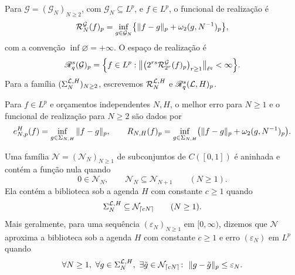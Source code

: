 \documentclass[12pt,a4paper]{article}
\begin{document}
\begin{definicao}
\label{lp:def:realization}
Para $\mathcal G=(\mathcal G_N)_{N\ge2}$, com $\mathcal G_N\subseteq L^p$, e $f\in L^p$, o funcional de realização é
\begin{equation}
 \mathcal R^{\mathcal G}_{N}(f)_p
 =\inf_{g\in\mathcal G_N}\bigl\{\|f-g\|_p+\omega_2(g,N^{-1})_{p}\bigr\},
 \label{lp:eq:realization-p}
\end{equation}
com a convenção $\inf\varnothing=+\infty$. O espaço de realização é
\begin{equation}
 \mathscr R^{s}_{q}(\mathcal G)_p
 =\Bigl\{f\in L^p:\big\|\big(2^{rs}\mathcal R^{\mathcal G}_{2^r}(f)_p\big)_{r\ge1}\big\|_{\ell^q}<\infty\Bigr\}.
 \label{lp:eq:stratum-p}
\end{equation}
Para a família $(\Sigma_{N}^{\mathcal L,H})_{N\ge2}$, escrevemos $\mathcal R^{\mathcal L,H}_{N}$ e $\mathscr R^{s}_{q}(\mathcal L,H)_p$.
\end{definicao}

Para $f\in L^p$ e orçamentos independentes $N,H$, o melhor erro para $N\ge1$ e o funcional de realização para $N\ge2$ são dados por
\[
 e^H_{N,p}(f)=\inf_{g\in\Sigma_{N,H}}\|f-g\|_p,\qquad
 R_{N,H}(f)_p=\inf_{g\in\Sigma_{N,H}}
 \bigl(\|f-g\|_p+\omega_2(g,N^{-1})_{p}\bigr).
\]

\begin{definicao}
\label{lp:def:network-family}
Uma família $\mathcal N=(\mathcal N_N)_{N\ge1}$ de subconjuntos de $C([0,1])$ é aninhada e contém a função nula quando
\begin{equation}
 0\in\mathcal N_N,\qquad \mathcal N_N\subseteq\mathcal N_{N+1}\qquad(N\ge1).
 \label{lp:eq:nesting}
\end{equation}
Ela contém a biblioteca sob a agenda $H$ com constante $c\ge1$ quando
\begin{equation}
 \Sigma_{N}^{\mathcal L,H}\subseteq\mathcal N_{\lceil cN\rceil}\qquad(N\ge1).
 \label{lp:eq:contains}
\end{equation}
Mais geralmente, para uma sequência $(\varepsilon_N)_{N\ge1}$ em $[0,\infty)$, dizemos que $\mathcal N$ aproxima a biblioteca sob a agenda $H$ com constante $c\ge1$ e erro $(\varepsilon_N)$ em $L^p$ quando
\begin{equation}
 \forall N\ge1,\ \forall g\in\Sig{N},\ \exists\tilde g\in\mathcal N_{\lceil cN\rceil}\colon\ \|g-\tilde g\|_p\le\varepsilon_N.
 \label{lp:eq:approx-contains}
\end{equation}
\end{definicao}
\end{document}
